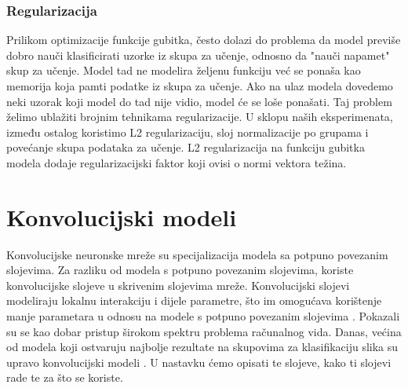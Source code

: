 \documentclass[times, utf8, diplomski,  numeric]{fer}
\begin{document}
\subsubsection{Regularizacija}
Prilikom optimizacije funkcije gubitka, često dolazi do problema da model previše dobro nauči klasificirati uzorke iz skupa za učenje, odnosno da "nauči napamet" skup za učenje. Model tad ne modelira željenu funkciju već se ponaša kao memorija koja pamti podatke iz skupa za učenje. Ako na ulaz modela dovedemo neki uzorak koji model do tad nije vidio, model će se loše ponašati. Taj problem želimo ublažiti brojnim tehnikama regularizacije. U sklopu naših eksperimenata, između ostalog koristimo L2 regularizaciju, sloj normalizacije po grupama i povećanje skupa podataka za učenje. L2 regularizacija na funkciju gubitka modela dodaje regularizacijski faktor koji ovisi o normi vektora težina.
\newpage
\section{Konvolucijski modeli}
Konvolucijske neuronske mreže su specijalizacija modela sa potpuno povezanim slojevima. Za razliku od modela s potpuno povezanim slojevima, koriste konvolucijske slojeve u skrivenim slojevima mreže. Konvolucijski slojevi modeliraju lokalnu interakciju i dijele parametre, što im omogućava korištenje manje parametara u odnosu na  modele s potpuno povezanim slojevima \cite{du-web}. Pokazali su se kao dobar pristup širokom spektru problema računalnog vida. Danas, većina od modela koji ostvaruju najbolje rezultate na skupovima za klasifikaciju slika su upravo konvolucijski modeli \cite{leaderboards}. U nastavku ćemo opisati te slojeve, kako ti slojevi rade te za što se koriste.
\end{document}
